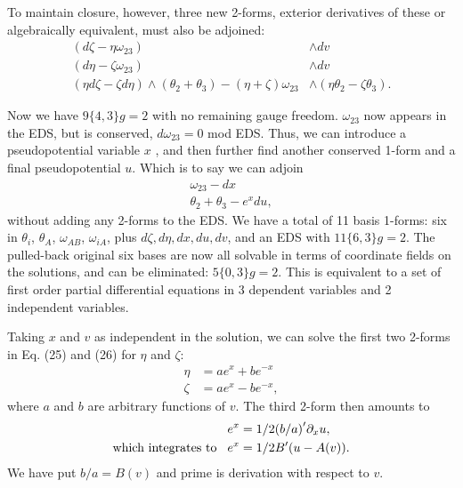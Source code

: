 \documentclass[a4paper,a4paper]{article}
\begin{document}
To maintain closure,  however,  three new 2-forms,  exterior derivatives
of these or algebraically equivalent,  must also be adjoined:
\begin{align}
(d{\zeta } - \eta {\omega }_{23}) &\wedge {dv}  \\
(d{\eta } - \zeta {\omega }_{23}) &\wedge {dv}  \\
(\eta {d\zeta }- \zeta {d\eta }) \wedge ({{\theta }_2}+{{\theta }_3})-
(\eta + \zeta ){\omega }_{23} &\wedge (\eta {\theta }_{2} - \zeta
{\theta }_{3}).
\end{align}

Now we have $9\{4, 3\} g = 2$ with no remaining gauge freedom. ${\omega
}_{23}$ now appears in the EDS,  but is conserved,  ${d\omega
}_{23}= 0$ mod EDS. Thus,  we can introduce a pseudopotential variable
$x$ ,  and then further find another conserved 1-form and a final
pseudopotential $u$. Which is to say we can adjoin
\begin{align}
{{\omega }_{23}}-{dx}  \\
{{\theta }_2}+{{\theta }_3}-{e^x}{du},
\end{align}
without adding any 2-forms to the EDS. We have a total of 11 basis
1-forms: six in ${\theta }_{i}$,  ${\theta }_{A}$,  ${\omega }_{AB}$,
${\omega }_{iA}$,  plus $d\zeta,  d\eta,  dx,  du,  dv$,  and an EDS
with $11\{6, 3\} g = 2$. The pulled-back original six bases
are now all solvable in terms of coordinate fields on the solutions,
and can be eliminated: $5\{0, 3\} g = 2$.  This is equivalent to a set
of first order partial differential equations in 3 dependent variables and 2
independent variables.

        Taking $x$ and $v$ as independent in the solution,  we can solve
the first two 2-forms in Eq. (25) and (26) for \(\eta \) and \(\zeta \):
\begin{align}
\eta  &= a {e^x}+b {e^{-x}}  \\
\zeta &=a {e^x}-b {e^{-x}},
\end{align}
where $a$ and $b$ are arbitrary functions of $v$. The third 2-form then
amounts to
\begin{align}
{e^x}&= 1/2{{(b/a)}^\prime} {{\partial }_x}u,  \\
\mbox{which integrates to}\hspace{0.3cm} {e^x}&= 1/2{B^\prime}(u-A(v)).
\end{align}
We have put $b/a = B(v)$ and prime is derivation with respect to $v$.
\end{document}
